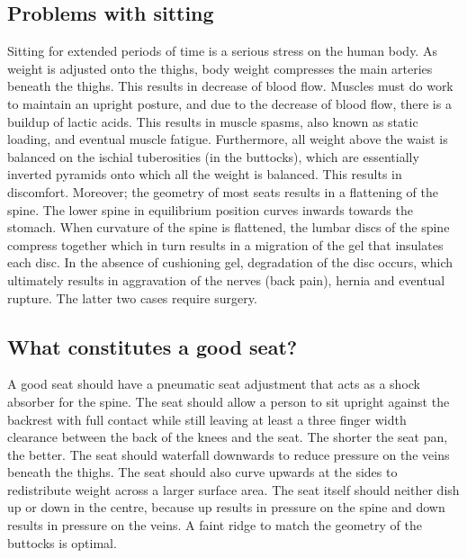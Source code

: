 \documentclass[11pt]{article}
\begin{document}
\subsection{Problems with sitting}
\label{sec:sittingproblems}

Sitting for extended periods of time is a serious stress on the human body. As weight is adjusted
onto the thighs, body weight compresses the main arteries beneath the thighs. This results in 
decrease of blood flow. Muscles must do work to maintain an upright posture, and due to the decrease 
of blood flow, there is a buildup of lactic acids. This results in muscle spasms, also known as static
loading, and eventual muscle fatigue. Furthermore, all weight above the waist is balanced on the ischial 
tuberosities (in the buttocks), which are essentially inverted pyramids onto which all the weight is 
balanced. This results in discomfort. Moreover; the geometry of most seats results in a flattening of the 
spine. The lower spine in equilibrium position curves inwards towards the stomach. When curvature of the 
spine is flattened, the lumbar discs of the spine compress together which in turn results in a migration of 
the gel that insulates each disc. In the absence of cushioning gel, degradation of the disc occurs, which 
ultimately results in aggravation of the nerves (back pain), hernia and eventual rupture. The latter two cases
require surgery\cite{ergoCentricAnatomy2011}.

\subsection{What constitutes a good seat?}
A good seat should have a pneumatic seat adjustment that acts as a shock absorber for the spine. The seat 
should allow a person to sit upright against the backrest with full contact while still leaving at least a 
three finger width clearance between the back of the knees and the seat. The shorter the seat pan, the better. 
The seat should waterfall downwards to reduce pressure on the veins beneath the thighs. The seat should also curve 
upwards at the sides to redistribute weight across a larger surface area. The seat itself should neither dish 
up or down in the centre, because up results in pressure on the spine and down results in pressure on the veins. 
A faint ridge to match the geometry of the buttocks is optimal\cite{ergoCentricchair2011, Natpost2005}.
\end{document}

